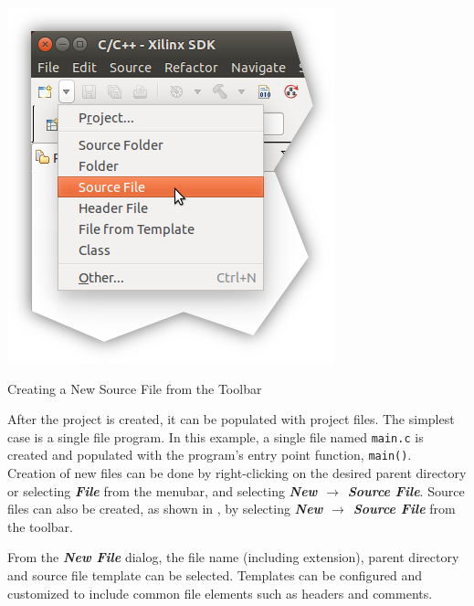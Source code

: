 \begin{marginfigure}
	\centering
	\includegraphics{images/New_File.png}
	\caption[Creating a New Source File from the Toolbar]{Creating a New Source File from the Toolbar}
	\label{fig:newfiletoolbar}
\end{marginfigure}


After the project is created, it can be populated with project files. The simplest case is a single file program. In this example, a single file named \texttt{main.c} is created and populated with the program's entry point function, \Verb|main()|. \\


\noindent
Creation of new files can be done by right-clicking on the desired parent directory or selecting \textit{\bfseries File} from the menubar, and selecting \textit{\bfseries New $\rightarrow$ Source File}. Source files can also be created, as shown in , by selecting \textit{\bfseries New $\rightarrow$ Source File} from the toolbar. \\

\begin{fullwidth}
\end{fullwidth}

\noindent
From the \textit{\bfseries New File} dialog, the file name (including extension), parent directory and source file template can be selected. Templates can be configured and customized to include common file elements such as headers and comments. \\

